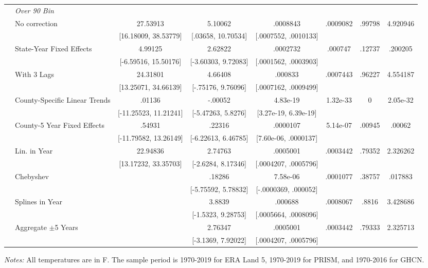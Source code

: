 \begin{landscape}
\begin{table}[htb]
\begin{threeparttable}
{\begin{tabular}{llcccccc}
\cmidrule(lr){2-8}  & \textit{Over 90 Bin} \\
 & \multirow{2}{*}{No correction} & 27.53913 & 5.10062 &  .0008843 & .0009082 & .99798 & 4.920946 \\  & & [16.18009, 38.53779] & [.03658, 10.70534] & [.0007552, .0010133] & & \\ & \multirow{2}{*}{State-Year Fixed Effects} & 4.99125 & 2.62822 &  .0002732 & .000747 & .12737 & .200205 \\  & & [-6.59516, 15.50176] & [-3.60303, 9.72083] & [.0001562, .0003903] & & \\ & \multirow{2}{*}{With 3 Lags} & 24.31801 & 4.66408 &   .000833 & .0007443 & .96227 & 4.554187 \\  & & [13.25071, 34.66139] & [-.75176, 9.76096] & [.0007162, .0009499] & & \\ & \multirow{2}{*}{County-Specific Linear Trends} & .01136 & -.00052 &  4.83e-19 & 1.32e-33 & 0 & 2.05e-32 \\  & & [-11.25523, 11.21241] & [-5.47263, 5.8276] & [3.27e-19, 6.39e-19] & & \\ & \multirow{2}{*}{County-5 Year Fixed Effects} & .54931 & .22316 &  .0000107 & 5.14e-07 & .00945 & .00062 \\  & & [-11.79582, 13.26149] & [-6.22613, 6.46785] & [7.60e-06, .0000137] & & \\ & \multirow{2}{*}{Lin. in Year} & 22.94836 & 2.74763 &  .0005001 & .0003442 & .79352 & 2.326262 \\  & & [13.17232, 33.35703] & [-2.6284, 8.17346] & [.0004207, .0005796] & & \\ & \multirow{2}{*}{Chebyshev} &  & .18286 &  7.58e-06 & .0001077 & .38757 & .017883 \\  & &  & [-5.75592, 5.78832] & [-.0000369, .000052] & & \\ & \multirow{2}{*}{Splines in Year} &  & 3.8839 &   .000688 & .0008067 & .8816 & 3.428686 \\  & &  & [-1.5323, 9.28753] & [.0005664, .0008096] & & \\ & \multirow{2}{*}{Aggregate \(\pm\)5 Years} &  & 2.76347 &  .0005001 & .0003442 & .79333 & 2.325713 \\  & &  & [-3.1369, 7.92022] & [.0004207, .0005796] & & \\
\hline \hline
\end{tabular}
}
\begin{tablenotes}
\footnotesize \textit{Notes:} All temperatures are in \degree F. The sample period is 1970-2019 for ERA Land 5, 1970-2019 for PRISM, and 1970-2016 for GHCN.
\end{tablenotes}
\end{threeparttable}
\end{table}
\end{landscape}
\restoregeometry
